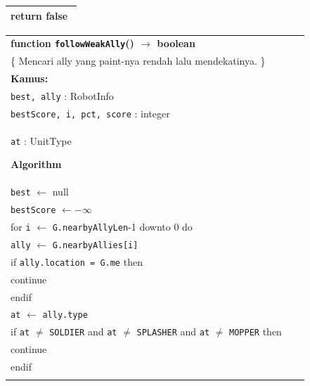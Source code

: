 \documentclass{article}
\newenvironment{pseudobox}
{
\centering
\begin{longtable}{|p{0.94\linewidth}|}
\hline
}
{
\\ \hline
\end{longtable}
\vspace{0.05cm}
}
\begin{document}
\begin{enumerate}[label=\alph*.]
\begin{enumerate}[label=\alph*.]
\begin{pseudobox}
\hspace*{1.5em}return false
\end{pseudobox}

\begin{pseudobox}
\textbf{function \texttt{followWeakAlly}() $\rightarrow$ boolean} \\
\{ Mencari ally yang paint-nya rendah lalu mendekatinya. \} \\

\textbf{Kamus:} \\
\hspace*{1.5em}\texttt{best, ally} : RobotInfo \\
\hspace*{1.5em}\texttt{bestScore, i, pct, score} : integer \\
\hspace*{1.5em}\texttt{at} : UnitType

\textbf{Algorithm} \\
\hspace*{1.5em}\texttt{best} $\leftarrow$ null \\
\hspace*{1.5em}\texttt{bestScore} $\leftarrow -\infty$ \\

\hspace*{1.5em}for \texttt{i} $\leftarrow$ \texttt{G.nearbyAllyLen}-1 downto 0 do \\
\hspace*{3em}\texttt{ally} $\leftarrow$ \texttt{G.nearbyAllies[i]} \\

\hspace*{3em}if \texttt{ally.location = G.me} then \\
\hspace*{4.5em}continue \\
\hspace*{3em}endif \\

\hspace*{3em}\texttt{at} $\leftarrow$ \texttt{ally.type} \\
\hspace*{3em}if \texttt{at} $\neq$ \texttt{SOLDIER} and \texttt{at} $\neq$ \texttt{SPLASHER} and \texttt{at} $\neq$ \texttt{MOPPER} then \\
\hspace*{4.5em}continue \\
\hspace*{3em}endif \\


\end{pseudobox}
\end{enumerate}
\end{enumerate}
\end{document}
